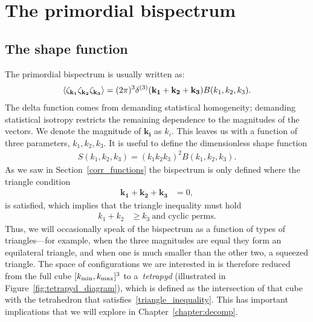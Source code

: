 \section{The primordial bispectrum}
    \subsection{The shape function}
The primordial bispectrum is usually written as:
\begin{align}\label{bispectrum_definition}
{
\left< \zeta_{\bf{k_1}}\zeta_{\bf{k_2}}\zeta_{\bf{k_3}} \right>
= (2\pi)^3\delta^{(3)}(\mathbf{k_1}+\mathbf{k_2}+\mathbf{k_3})B(k_1,k_2,k_3).
}
\end{align}
The delta function comes from demanding statistical homogeneity;
demanding statistical isotropy restricts the remaining dependence to the magnitudes of the vectors.
We denote the magnitude of $\mathbf{k_i}$ as $k_i$.
This leaves us with a function of three parameters,
$k_1,k_2,k_3$.
It is useful to define the dimensionless shape function
\begin{align}\label{shapefn}
    S(k_1,k_2,k_3) = (k_1k_2k_3)^2B(k_1,k_2,k_3).
\end{align}
As we saw in Section~\ref{corr_functions}
the bispectrum is only defined where the triangle condition
\begin{align}\label{triangle_condition}
    \mathbf{k_1}+\mathbf{k_2}+\mathbf{k_3} &= 0,
\end{align}
is satisfied, which implies that the triangle inequality must hold
\begin{align}\label{triangle_inequality}
    k_1+k_2 &\geq k_3~\text{and cyclic perms}.
\end{align}
Thus, we will occasionally speak of the bispectrum as a function of types
of triangles---for example, when the three magnitudes are
equal they form an equilateral triangle, and when one is much smaller than
the other two, a squeezed triangle.
The space of configurations we are interested in is therefore
reduced from the full cube $[{k_\text{min}},{k_\text{max}}]^3$
to a~\textit{tetrapyd} (illustrated in Figure~\ref{fig:tetrapyd_diagram}),
which is defined as the intersection of that cube with the
tetrahedron that satisfies~\eqref{triangle_inequality}.
This has important implications that we will explore in
Chapter~\ref{chapter:decomp}. 
